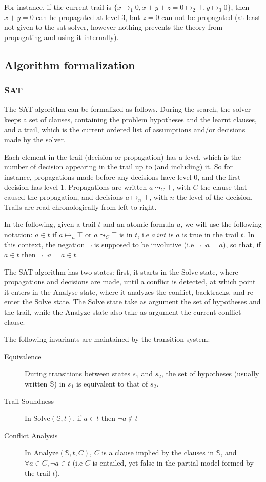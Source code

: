 For instance, if the current trail is $\{x \mapsto_1 0, x + y + z = 0 \mapsto_2 \top, y\mapsto_3 0\}$,
then $x + y = 0$ can be propagated at level $3$, but $z = 0$ can not be propagated (at least not
given to the sat solver, however nothing prevents the theory from propagating and using it internally).

\subsection{Algorithm formalization}

\subsubsection{SAT}

The SAT algorithm can be formalized as follows. During the search, the solver keeps
a set of clauses, containing the problem hypotheses and the learnt clauses, and
a trail, which is the current ordered list of assumptions and/or decisions made by
the solver.

Each element in the trail (decision or propagation) has a level, which is the number of decision
appearing in the trail up to (and including) it. So for instance, propagations made before any
decisions have level $0$, and the first decision has level $1$. Propagations are written
$a \leadsto_C \top$, with $C$ the clause that caused the propagation, and decisions
$a \mapsto_n \top$, with $n$ the level of the decision. Trails are read
chronologically from left to right.

In the following, given a trail $t$ and an atomic formula $a$, we will use the following notation:
$a \in t$ if $a \mapsto_n \top$ or $a \leadsto_C \top$ is in $t$, i.e $a\ in t$ is $a$ is true
in the trail $t$. In this context, the negation $\neg$ is supposed to be involutive (i.e $\neg \neg a = a$),
so that, if $a \in t$ then $\neg \neg a = a \in t$.

The SAT algorithm has two states: first, it starts in the $\text{Solve}$ state, where propagations
and decisions are made, until a conflict is detected, at which point it enters in the $\text{Analyse}$
state, where it analyzes the conflict, backtracks, and re-enter the $\text{Solve}$ state.
The $\text{Solve}$ state take as argument the set of hypotheses and the trail, while
the $\text{Analyze}$ state also take as argument the current conflict clause.

The following invariants are maintained by the transition system:
\begin{description}
  \item[Equivalence] During transitions between states $s_1$ and $s_2$, the set of hypotheses
    (usually written $\mathbb{S}$) in $s_1$ is equivalent to that of $s_2$.
  \item[Trail Soundness] In $\text{Solve}(\mathbb{S}, t)$, if $a \in t$ then $\neg a \notin t$
  \item[Conflict Analysis] In $\text{Analyze}(\mathbb{S}, t, C)$, $C$ is a clause implied by the
    clauses in $\mathbb{S}$, and $\forall a \in C, \neg a \in t$ (i.e $C$ is entailed, yet false
    in the partial model formed by the trail $t$).
\end{description}


